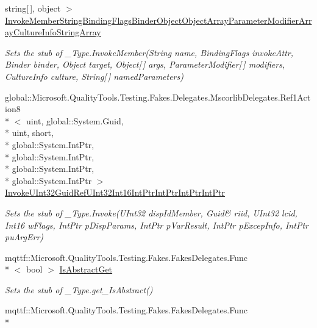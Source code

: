 \begin{DoxyCompactItemize}
string\mbox{[}$\,$\mbox{]}, object $>$ \hyperlink{class_system_1_1_runtime_1_1_interop_services_1_1_fakes_1_1_stub___type_ae229c26415872e2a33d4e2b8e3ba3662}{Invoke\-Member\-String\-Binding\-Flags\-Binder\-Object\-Object\-Array\-Parameter\-Modifier\-Array\-Culture\-Info\-String\-Array}
\begin{DoxyCompactList}\small\item\em Sets the stub of \-\_\-\-Type.\-Invoke\-Member(\-String name, Binding\-Flags invoke\-Attr, Binder binder, Object target, Object\mbox{[}$\,$\mbox{]} args, Parameter\-Modifier\mbox{[}$\,$\mbox{]} modifiers, Culture\-Info culture, String\mbox{[}$\,$\mbox{]} named\-Parameters)\end{DoxyCompactList}\item 
global\-::\-Microsoft.\-Quality\-Tools.\-Testing.\-Fakes.\-Delegates.\-Mscorlib\-Delegates.\-Ref1\-Action8\\*
$<$ uint, global\-::\-System.\-Guid, \\*
uint, short, \\*
global\-::\-System.\-Int\-Ptr, \\*
global\-::\-System.\-Int\-Ptr, \\*
global\-::\-System.\-Int\-Ptr, \\*
global\-::\-System.\-Int\-Ptr $>$ \hyperlink{class_system_1_1_runtime_1_1_interop_services_1_1_fakes_1_1_stub___type_a680a7cc74d9df492f540685225d68f5d}{Invoke\-U\-Int32\-Guid\-Ref\-U\-Int32\-Int16\-Int\-Ptr\-Int\-Ptr\-Int\-Ptr\-Int\-Ptr}
\begin{DoxyCompactList}\small\item\em Sets the stub of \-\_\-\-Type.\-Invoke(U\-Int32 disp\-Id\-Member, Guid\& riid, U\-Int32 lcid, Int16 w\-Flags, Int\-Ptr p\-Disp\-Params, Int\-Ptr p\-Var\-Result, Int\-Ptr p\-Excep\-Info, Int\-Ptr pu\-Arg\-Err)\end{DoxyCompactList}\item 
mqttf\-::\-Microsoft.\-Quality\-Tools.\-Testing.\-Fakes.\-Fakes\-Delegates.\-Func\\*
$<$ bool $>$ \hyperlink{class_system_1_1_runtime_1_1_interop_services_1_1_fakes_1_1_stub___type_a0e098f07885e6ae16f6bf03d7d8b1079}{Is\-Abstract\-Get}
\begin{DoxyCompactList}\small\item\em Sets the stub of \-\_\-\-Type.\-get\-\_\-\-Is\-Abstract()\end{DoxyCompactList}\item 
mqttf\-::\-Microsoft.\-Quality\-Tools.\-Testing.\-Fakes.\-Fakes\-Delegates.\-Func\\*

\end{DoxyCompactItemize}
